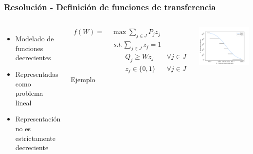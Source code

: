 \documentclass[aspectratio=43, 10pt]{beamer}
\begin{document}
\begin{frame}
    \frametitle{Resolución - Definición de funciones de transferencia}

    \begin{columns}[c]
            \begin{itemize}
                \item{Modelado de funciones decrecientes}
                \item{Representadas como problema lineal}
                \item{Representación no es estrictamente decreciente}
            \end{itemize}
            \begin{align*}
              f(W) =\; & \max \sum_{j \in J} P_j z_j   & \\
                       & \;s.t. \sum_{j \in J} z_j = 1   & \\
                       & \qquad Q_j \geq W z_j         & \forall j \in J \\
                       & \qquad z_j \in \{0,1\}        & \forall j \in J
            \end{align*}
            Ejemplo

            \vspace{.5cm}
            \includegraphics[width=1.1\textwidth]{../resources/f_example.png}
    \end{columns}
\end{frame}
\end{document}
